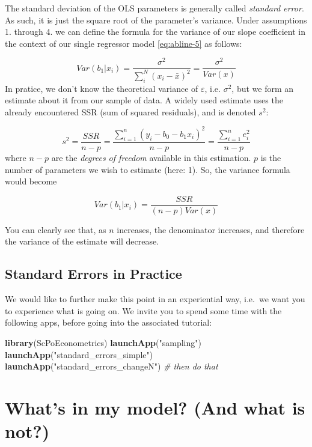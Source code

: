 \documentclass[]{book}
\newenvironment{Shaded}{\begin{snugshade}}{\end{snugshade}}
\newcommand{\KeywordTok}[1]{\textcolor[rgb]{0.13,0.29,0.53}{\textbf{#1}}}
\newcommand{\StringTok}[1]{\textcolor[rgb]{0.31,0.60,0.02}{#1}}
\newcommand{\CommentTok}[1]{\textcolor[rgb]{0.56,0.35,0.01}{\textit{#1}}}
\newcommand{\NormalTok}[1]{#1}
\theoremstyle{definition}
\theoremstyle{definition}
\theoremstyle{definition}
\theoremstyle{remark}
\begin{document}
The standard deviation of the OLS parameters is generally called
\emph{standard error}. As such, it is just the square root of the
parameter's variance. Under assumptions 1. through 4. we can define the
formula for the variance of our slope coefficient in the context of our
single regressor model \eqref{eq:abline-5} as follows:

\[
Var(b_1|x_i) = \frac{\sigma^2}{\sum_i^N (x_i - \bar{x})^2} = \frac{\sigma^2}{Var(x)}  \label{eq:var-ols}
\] In pratice, we don't know the theoretical variance of
\(\varepsilon\), i.e. \(\sigma^2\), but we form an estimate about it
from our sample of data. A widely used estimate uses the already
encountered SSR (sum of squared residuals), and is denoted \(s^2\):

\[
s^2 = \frac{SSR}{n-p} = \frac{\sum_{i=1}^n (y_i - b_0 - b_1 x_i)^2}{n-p} =  \frac{\sum_{i=1}^n e_i^2}{n-p}
\] where \(n-p\) are the \emph{degrees of freedom} available in this
estimation. \(p\) is the number of parameters we wish to estimate (here:
1). So, the variance formula would become

\[
Var(b_1|x_i) = \frac{SSR}{(n-p)Var(x)}  \label{eq:var-ols2}
\]

You can clearly see that, as \(n\) increases, the denominator increases,
and therefore the variance of the estimate will decrease.

\subsection{Standard Errors in
Practice}\label{standard-errors-in-practice}

We would like to further make this point in an experiential way, i.e.~we
want you to experience what is going on. We invite you to spend some
time with the following apps, before going into the associated tutorial:

\begin{Shaded}
\begin{Highlighting}[]
\KeywordTok{library}\NormalTok{(ScPoEconometrics)}
\KeywordTok{launchApp}\NormalTok{(}\StringTok{"sampling"}\NormalTok{)  }
\KeywordTok{launchApp}\NormalTok{(}\StringTok{"standard_errors_simple"}\NormalTok{) }
\KeywordTok{launchApp}\NormalTok{(}\StringTok{"standard_errors_changeN"}\NormalTok{)  }\CommentTok{# then do that}
\end{Highlighting}
\end{Shaded}

\section{What's in my model? (And what is
not?)}\label{whats-in-my-model-and-what-is-not}
\end{document}
